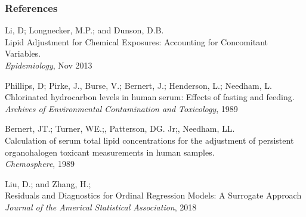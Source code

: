 \documentclass{beamer}\usepackage[]{graphicx}\usepackage[]{color}
\begin{document}
\begin{frame}
\frametitle{References}
\footnotesize{
\begin{thebibliography}{99} %
	
	 Li, D; Longnecker, M.P.; and Dunson, D.B. \\
	\newblock Lipid Adjustment for Chemical Exposures: Accounting for Concomitant Variables.\\
	\newblock \emph{Epidemiology}, Nov 2013

	Phillips, D; Pirke, J., Burse, V.; Bernert, J.; Henderson, L.; Needham, L.\\
	\newblock Chlorinated hydrocarbon levels in human serum: Effects of fasting and feeding.\\
	\newblock \emph{Archives of Environmental Contamination and Toxicology}, 1989
	
	 Bernert, JT.; Turner, WE.;, Patterson, DG. Jr;, Needham, LL.\\
	\newblock Calculation of serum total lipid concentrations for the adjustment of persistent organohalogen toxicant measurements in human samples.\\
	\newblock \emph{Chemosphere}, 1989
	
	 Liu, D.; and Zhang, H.;\\
	\newblock Residuals and Diagnostics for Ordinal Regression Models: A Surrogate Approach\\
	\newblock \emph{Journal of the Americal Statistical Association}, 2018
	
\end{thebibliography}
}
\end{frame}
\appendix
\end{document}
